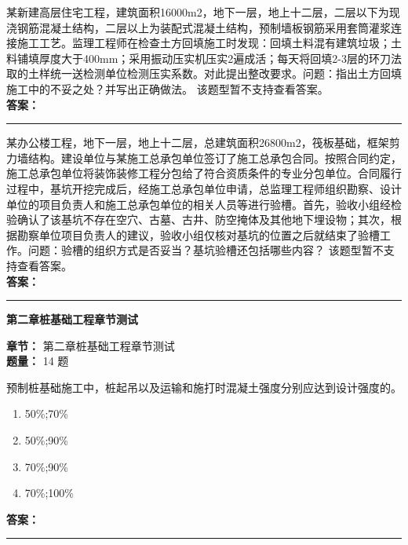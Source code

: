 \documentclass[UTF8,fontset=fandol,11pt]{ctexart}
\newcommand{\chaptertitle}[1]{\vspace{0.5em}\begin{tcolorbox}[enhanced,colback=deepblue,colframe=deepblue,arc=2mm,boxrule=0pt]\begin{center}\Large\bfseries\color{white}#1\end{center}\end{tcolorbox}\vspace{0.5em}}
\newcommand{\answerline}{\textcolor{answerred}{\rule{2.4cm}{0.7pt}}}
\begin{document}
\vspace{0.2em}

\begin{quizbox}[title={第 34 题}]
某新建高层住宅工程，建筑面积16000m2，地下一层，地上十二层，二层以下为现浇钢筋混凝土结构，二层以上为装配式混凝土结构，预制墙板钢筋采用套筒灌浆连接施工工艺。监理工程师在检查土方回填施工时发现：回填土料混有建筑垃圾；土料铺填厚度大于400mm；采用振动压实机压实2遍成活；每天将回填2-3层的环刀法取的土样统一送检测单位检测压实系数。对此提出整改要求。问题：指出土方回填施工中的不妥之处？并写出正确做法。 该题型暂不支持查看答案。\\
\textbf{\textcolor{answerred}{答案：}} \answerline
\end{quizbox}

\vspace{0.2em}

\begin{quizbox}[title={第 35 题}]
某办公楼工程，地下一层，地上十二层，总建筑面积26800m2，筏板基础，框架剪力墙结构。建设单位与某施工总承包单位签订了施工总承包合同。按照合同约定，施工总承包单位将装饰装修工程分包给了符合资质条件的专业分包单位。合同履行过程中，基坑开挖完成后，经施工总承包单位申请，总监理工程师组织勘察、设计单位的项目负责人和施工总承包单位的相关人员等进行验槽。首先，验收小组经检验确认了该基坑不存在空穴、古墓、古井、防空掩体及其他地下埋设物；其次，根据勘察单位项目负责人的建议，验收小组仅核对基坑的位置之后就结束了验槽工作。问题：验槽的组织方式是否妥当？基坑验槽还包括哪些内容？ 该题型暂不支持查看答案。\\
\textbf{\textcolor{answerred}{答案：}} \answerline
\end{quizbox}

\vspace{0.2em}

\chaptertitle{第二章桩基础工程章节测试}
\begin{mainbox}
\textbf{\textcolor{mainblue}{章节：}} 第二章桩基础工程章节测试\\
\textbf{\textcolor{answerred}{题量：}} 14 题
\end{mainbox}

\begin{quizbox}[title={第 1 题}]
预制桩基础施工中，桩起吊以及运输和施打时混凝土强度分别应达到设计强度的。\\
\begin{enumerate}[label=\Alph*.]
\item 50\%;70\%
\item 50\%;90\%
\item 70\%;90\%
\item 70\%;100\%
\end{enumerate}
\textbf{\textcolor{answerred}{答案：}} \answerline
\end{quizbox}
\end{document}

